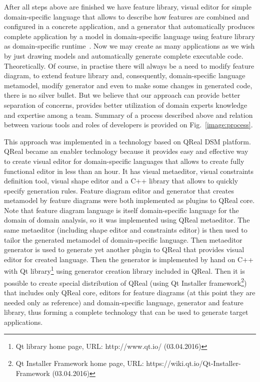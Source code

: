 \documentclass[conference]{IEEEtran}
\begin{document}
After all steps above are finished we have feature library, visual editor for simple domain-specific language that allows to describe how features are combined and configured in a concrete application, and a generator that automatically produces complete application by a model in domain-specific language using feature library as domain-specific runtime~\cite{kelly2008domain}. Now we may create as many applications as we wish by just drawing models and automatically generate complete executable code. Theoretically. Of course, in practise there will always be a need to modify feature diagram, to extend feature library and, consequently, domain-specific language metamodel, modify generator and even to make some changes in generated code, there is no silver bullet. But we believe that our approach can provide better separation of concerns, provides better utilization of domain experts knowledge and expertise among a team. Summary of a process described above and relation between various tools and roles of developers is provided on Fig.~\ref{image:process}.

This approach was implemented in a technology based on QReal DSM platform. QReal became an enabler technology because it provides easy and effective way to create visual editor for domain-specific languages that allows to create fully functional editor in less than an hour. It has visual metaeditor, visual constraints definition tool, visual shape editor and a C++ library that allows to quickly specify generation rules. Feature diagram editor and generator that creates metamodel by feature diagrams were both implemented as plugins to QReal core. Note that feature diagram language is itself domain-specific language for the domain of domain analysis, so it was implemented using QReal metaeditor. The same metaeditor (including shape editor and constraints editor) is then used to tailor the generated metamodel of domain-specific language. Then metaeditor generator is used to generate yet another plugin to QReal that provides visual editor for created language. Then the generator is implemented by hand on C++ with Qt library\footnote{Qt library home page, URL: http://www.qt.io/ (03.04.2016)} using generator creation library included in QReal. Then it is possible to create special distribution of QReal (using Qt Installer framework\footnote{Qt Installer Framework home page, URL: https://wiki.qt.io/Qt-Installer-Framework (03.04.2016)}) that includes only QReal core, editors for feature diagrams (at this point they are needed only as reference) and domain-specific language, generator and feature library, thus forming a complete technology that can be used to generate target applications.
\end{document}
